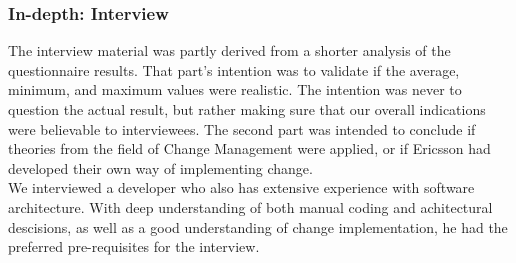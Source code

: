 \documentclass[final_report_innit.tex]{subfiles}
\begin{document}
\subsubsection{In-depth: Interview}
The interview material was partly derived from a shorter analysis of the questionnaire results. That part's intention was to validate if the average, minimum, and maximum values were realistic. The intention was never to question the actual result, but rather making sure that our overall indications were believable to interviewees. The second part was intended to conclude if theories from the field of Change Management were applied, or if Ericsson had developed their own way of implementing change.
\\

We interviewed a developer who also has extensive experience with software architecture. With deep understanding of both manual coding and achitectural descisions, as well as a good understanding of change implementation, he had the preferred pre-requisites for the interview.
\end{document}
